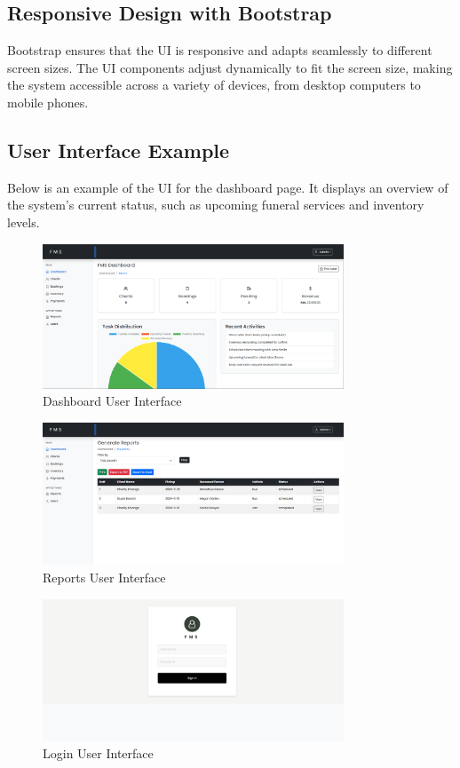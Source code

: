 \documentclass[a4paper,12pt]{report}
\begin{document}
\subsection{Responsive Design with Bootstrap}
Bootstrap ensures that the UI is responsive and adapts seamlessly to different screen sizes. The UI components adjust dynamically to fit the screen size, making the system accessible across a variety of devices, from desktop computers to mobile phones.

\subsection{User Interface Example}
Below is an example of the UI for the dashboard page. It displays an overview of the system’s current status, such as upcoming funeral services and inventory levels.

\begin{figure}[ht]
\centering
\includegraphics[width=0.8\textwidth]{../img/dashboard.png}
\caption{Dashboard User Interface}
\label{fig:dashboard_ui}
\end{figure}


\begin{figure}[ht]
    \centering
    \includegraphics[width=0.8\textwidth]{../img/resports.png}
    \caption{Reports User Interface}
    \label{fig:reports_ui}
\end{figure}

\begin{figure}[ht]
    \centering
    \includegraphics[width=0.8\textwidth]{../img/login.png}
    \caption{Login User Interface}
    \label{fig:login_ui}
\end{figure}
\end{document}
